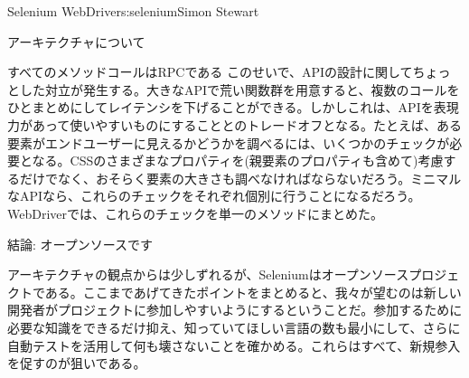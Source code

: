 \begin{aosachapter}{Selenium WebDriver}{s:selenium}{Simon Stewart}
\begin{aosasect1}{アーキテクチャについて}
\begin{aosasect2}{すべてのメソッドコールはRPCである}
このせいで、APIの設計に関してちょっとした対立が発生する。大きなAPIで荒い関数群を用意すると、複数のコールをひとまとめにしてレイテンシを下げることができる。しかしこれは、APIを表現力があって使いやすいものにすることとのトレードオフとなる。たとえば、ある要素がエンドユーザーに見えるかどうかを調べるには、いくつかのチェックが必要となる。CSSのさまざまなプロパティを(親要素のプロパティも含めて)考慮するだけでなく、おそらく要素の大きさも調べなければならないだろう。ミニマルなAPIなら、これらのチェックをそれぞれ個別に行うことになるだろう。WebDriverでは、これらのチェックを単一のメソッドにまとめた。

\end{aosasect2}

\begin{aosasect2}{結論: オープンソースです}

アーキテクチャの観点からは少しずれるが、Seleniumはオープンソースプロジェクトである。ここまであげてきたポイントをまとめると、我々が望むのは新しい開発者がプロジェクトに参加しやすいようにするということだ。参加するために必要な知識をできるだけ抑え、知っていてほしい言語の数も最小にして、さらに自動テストを活用して何も壊さないことを確かめる。これらはすべて、新規参入を促すのが狙いである。


\end{aosasect2}
\end{aosasect1}
\end{aosachapter}
